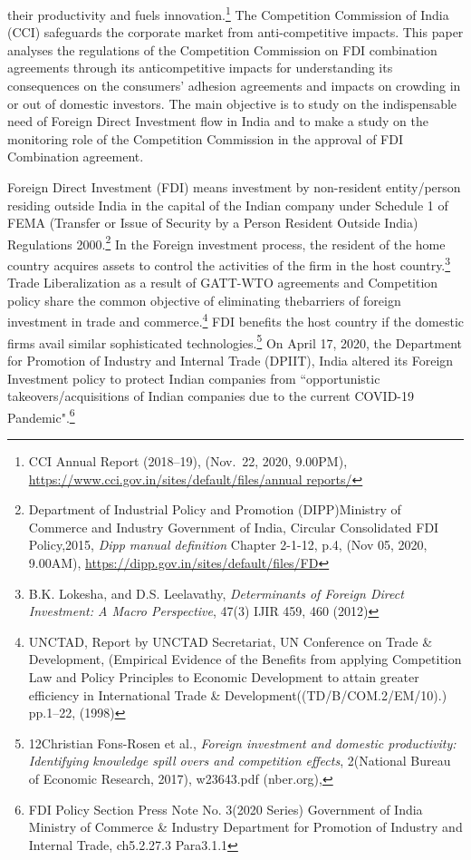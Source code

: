 \begin{multicols}{2}
their productivity and fuels innovation.\footnote{CCI Annual Report (2018--19), (Nov.\ 22, 2020, 9.00PM),
\url{https://www.cci.gov.in/sites/default/files/annual reports/}} The Competition Commission of India (CCI)
safeguards the corporate market from anti-competitive impacts. This paper analyses the
regulations of the Competition Commission on FDI combination agreements through its anticompetitive
impacts for understanding its consequences on the consumers’ adhesion
agreements and impacts on crowding in or out of domestic investors. The main objective is to
study on the indispensable need of Foreign Direct Investment flow in India and to make a
study on the monitoring role of the Competition Commission in the approval of FDI
Combination agreement.



\noi
Foreign Direct Investment (FDI) means investment by non-resident entity/person residing
outside India in the capital of the Indian company under Schedule 1 of FEMA (Transfer or
Issue of Security by a Person Resident Outside India) Regulations 2000.\footnote{Department of Industrial Policy and Promotion (DIPP)Ministry of Commerce and Industry Government of
India, Circular Consolidated FDI Policy,2015, \textit{Dipp manual definition} Chapter 2-1-12, p.4, (Nov 05, 2020, 
9.00AM), \url{https://dipp.gov.in/sites/default/files/FD}} In the Foreign
investment process, the resident of the home country acquires assets to control the activities
of the firm in the host country.\footnote{B.K. Lokesha, and D.S. Leelavathy, \textit{Determinants of Foreign Direct Investment: A Macro Perspective}, 47(3)
IJIR 459, 460 (2012)} Trade Liberalization as a result of GATT-WTO agreements
and Competition policy share the common objective of eliminating the\break barriers of foreign
investment in trade and commerce.\footnote{UNCTAD, Report by UNCTAD Secretariat, UN Conference on Trade \& Development, (Empirical Evidence
of the Benefits from applying Competition Law and Policy Principles to Economic Development to attain
greater efficiency in International Trade \& Development((TD/B/COM.2/EM/10).) pp.1--22, (1998)} FDI benefits the host country if the domestic firms avail
similar sophisticated technologies.\footnote{12Christian Fons-Rosen et al., \textit{Foreign investment and domestic productivity: Identifying knowledge spill overs
and competition effects}, 2(National Bureau of Economic Research, 2017), w23643.pdf (nber.org),} On April 17, 2020, the Department for Promotion of
Industry and Internal Trade (DPIIT), India altered its Foreign Investment policy to protect
Indian companies from ``opportunistic takeovers/acquisitions of Indian companies due to the
current COVID-19 Pandemic".\footnote{FDI Policy Section Press Note No. 3(2020 Series) Government of India Ministry of Commerce \& Industry
Department for Promotion of Industry and Internal Trade, ch5.2.27.3 Para3.1.1}


\end{multicols}
